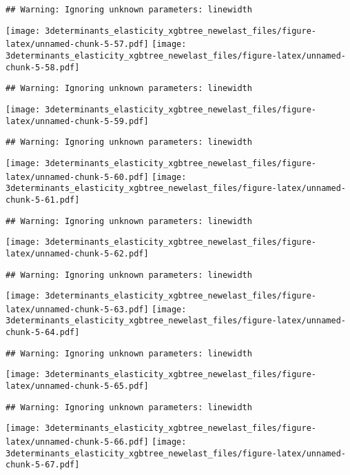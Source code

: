 \documentclass[
]{article}
\begin{document}
\begin{verbatim}
## Warning: Ignoring unknown parameters: linewidth
\end{verbatim}

\texttt{[image: 3determinants\_elasticity\_xgbtree\_newelast\_files/figure-latex/unnamed-chunk-5-57.pdf]}
\texttt{[image: 3determinants\_elasticity\_xgbtree\_newelast\_files/figure-latex/unnamed-chunk-5-58.pdf]}

\begin{verbatim}
## Warning: Ignoring unknown parameters: linewidth
\end{verbatim}

\texttt{[image: 3determinants\_elasticity\_xgbtree\_newelast\_files/figure-latex/unnamed-chunk-5-59.pdf]}

\begin{verbatim}
## Warning: Ignoring unknown parameters: linewidth
\end{verbatim}

\texttt{[image: 3determinants\_elasticity\_xgbtree\_newelast\_files/figure-latex/unnamed-chunk-5-60.pdf]}
\texttt{[image: 3determinants\_elasticity\_xgbtree\_newelast\_files/figure-latex/unnamed-chunk-5-61.pdf]}

\begin{verbatim}
## Warning: Ignoring unknown parameters: linewidth
\end{verbatim}

\texttt{[image: 3determinants\_elasticity\_xgbtree\_newelast\_files/figure-latex/unnamed-chunk-5-62.pdf]}

\begin{verbatim}
## Warning: Ignoring unknown parameters: linewidth
\end{verbatim}

\texttt{[image: 3determinants\_elasticity\_xgbtree\_newelast\_files/figure-latex/unnamed-chunk-5-63.pdf]}
\texttt{[image: 3determinants\_elasticity\_xgbtree\_newelast\_files/figure-latex/unnamed-chunk-5-64.pdf]}

\begin{verbatim}
## Warning: Ignoring unknown parameters: linewidth
\end{verbatim}

\texttt{[image: 3determinants\_elasticity\_xgbtree\_newelast\_files/figure-latex/unnamed-chunk-5-65.pdf]}

\begin{verbatim}
## Warning: Ignoring unknown parameters: linewidth
\end{verbatim}

\texttt{[image: 3determinants\_elasticity\_xgbtree\_newelast\_files/figure-latex/unnamed-chunk-5-66.pdf]}
\texttt{[image: 3determinants\_elasticity\_xgbtree\_newelast\_files/figure-latex/unnamed-chunk-5-67.pdf]}
\end{document}
